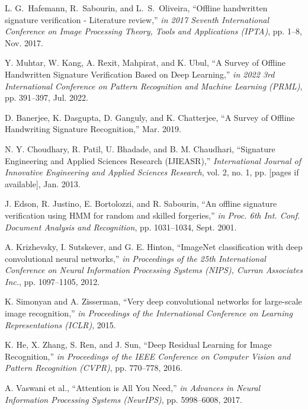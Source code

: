 \documentclass{article}
\begin{document}
\newpage
{}

\begin{thebibliography}{10}

	L. G.~Hafemann, R.~Sabourin, and L.~S.~Oliveira,
	``Offline handwritten signature verification - Literature review,''
	\emph{in 2017 Seventh International Conference on Image Processing Theory, Tools and Applications (IPTA)},
	pp. 1--8, Nov. 2017.

	Y. Muhtar, W. Kang, A. Rexit, Mahpirat, and K. Ubul,
	``A Survey of Offline Handwritten Signature Verification Based on Deep Learning,''
	\emph{in 2022 3rd International Conference on Pattern Recognition and Machine Learning (PRML)},
	pp. 391--397, Jul. 2022.

	D. Banerjee, K. Dasgupta, D. Ganguly, and K. Chatterjee,
	``A Survey of Offline Handwriting Signature Recognition,''
	Mar. 2019.

	N. Y. Choudhary, R. Patil, U. Bhadade, and B. M. Chaudhari,
	``Signature Engineering and Applied Sciences Research (IJIEASR),''
	\emph{International Journal of Innovative Engineering and Applied Sciences Research},
	vol. 2, no. 1, pp. [pages if available], Jan. 2013.

	J. Edson, R. Justino, E. Bortolozzi, and R. Sabourin,
	``An offline signature verification using HMM for random and skilled forgeries,''
	\emph{in Proc. 6th Int. Conf. Document Analysis and Recognition},
	pp. 1031--1034, Sept. 2001.

	A. Krizhevsky, I. Sutskever, and G. E. Hinton,
	``ImageNet classification with deep convolutional neural networks,''
	\emph{in Proceedings of the 25th International Conference on Neural Information Processing Systems (NIPS), Curran Associates Inc.},
	pp. 1097--1105, 2012.

	K. Simonyan and A. Zisserman,
	``Very deep convolutional networks for large-scale image recognition,''
	\emph{in Proceedings of the International Conference on Learning Representations (ICLR)},
	2015.

	K. He, X. Zhang, S. Ren, and J. Sun,
	``Deep Residual Learning for Image Recognition,''
	\emph{in Proceedings of the IEEE Conference on Computer Vision and Pattern Recognition (CVPR)},
	pp. 770--778, 2016.

	A. Vaswani et al.,
	``Attention is All You Need,''
	\emph{in Advances in Neural Information Processing Systems (NeurIPS)},
	pp. 5998--6008, 2017.


\end{thebibliography}
\end{document}
